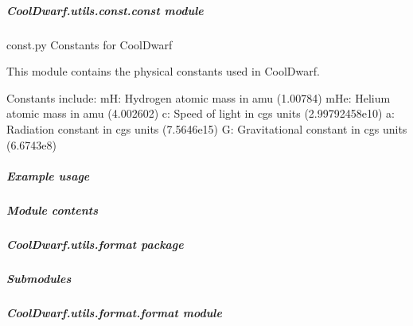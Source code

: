\documentclass[letterpaper,10pt,english]{sphinxmanual}
\begin{document}
\subparagraph{CoolDwarf.utils.const.const module}
\label{\detokenize{CoolDwarf.utils.const:module-CoolDwarf.utils.const.const}}\label{\detokenize{CoolDwarf.utils.const:cooldwarf-utils-const-const-module}}
\sphinxAtStartPar
const.py \textendash{} Constants for CoolDwarf

\sphinxAtStartPar
This module contains the physical constants used in CoolDwarf.

\sphinxAtStartPar
Constants include:
\sphinxhyphen{} mH: Hydrogen atomic mass in amu (1.00784)
\sphinxhyphen{} mHe: Helium atomic mass in amu (4.002602)
\sphinxhyphen{} c: Speed of light in cgs units (2.99792458e10)
\sphinxhyphen{} a: Radiation constant in cgs units (7.5646e\sphinxhyphen{}15)
\sphinxhyphen{} G: Gravitational constant in cgs units (6.6743e\sphinxhyphen{}8)


\subparagraph{Example usage}
\label{\detokenize{CoolDwarf.utils.const:example-usage}}
\begin{sphinxVerbatim}[commandchars=\\\{\}]
   
\PYG{p}{[}\PYG{p}{]}
\end{sphinxVerbatim}


\subparagraph{Module contents}
\label{\detokenize{CoolDwarf.utils.const:module-CoolDwarf.utils.const}}\label{\detokenize{CoolDwarf.utils.const:module-contents}}
\sphinxstepscope


\subparagraph{CoolDwarf.utils.format package}
\label{\detokenize{CoolDwarf.utils.format:cooldwarf-utils-format-package}}\label{\detokenize{CoolDwarf.utils.format::doc}}

\subparagraph{Submodules}
\label{\detokenize{CoolDwarf.utils.format:submodules}}

\subparagraph{CoolDwarf.utils.format.format module}
\label{\detokenize{CoolDwarf.utils.format:module-CoolDwarf.utils.format.format}}\label{\detokenize{CoolDwarf.utils.format:cooldwarf-utils-format-format-module}}
\end{document}
